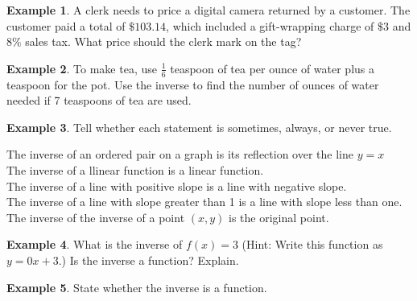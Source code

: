 \documentclass{report}
\theoremstyle{definition}
\newtheorem{example}{\bf Example}
\begin{document}
\begin{example}
A clerk needs to price a digital camera returned by a customer. The customer paid a total of $\$103.14$, which included a gift-wrapping charge of $\$3$ and $8\%$ sales tax. What price should the clerk mark on the tag?
\end{example}

\vfill

\begin{example}
To make tea, use $\displaystyle \frac{1}{6}$ teaspoon of tea  per ounce of water plus a teaspoon for the pot. Use the inverse to find the number of ounces of water needed if 7 teaspoons of tea are used.
\end{example}

\vfill

 \newpage
\begin{example}
\noindent Tell whether each statement is sometimes, always, or never true.\\
\end{example}

The inverse of an ordered pair on a graph is its reflection over the line $y=x$\\

The inverse of a llinear function is a linear function.\\

The inverse of a line with positive slope is a line with negative slope.\\

The inverse of a line with slope greater than 1 is a line with slope less than one.\\

The inverse of the inverse of a point $(x,y)$ is the original point.\\

\vspace{1cm}

\begin{example}
\noindent What is the inverse of $f(x)=3$ (Hint: Write this function as $y=0x+3$.) Is the inverse a function? Explain.\\
\end{example}
\vfill


\begin{example}
State whether the inverse is a function.
\end{example}
\end{document}
